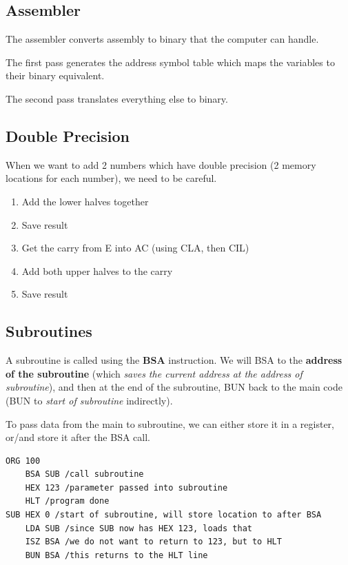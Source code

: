 \documentclass[12pt,letterpaper]{article} \usepackage{amsmath} \usepackage{graphicx} \usepackage[margin=1in]{geometry} \usepackage{longtable}  \usepackage{amssymb}
\begin{document}
			\subsection{Assembler}
			The assembler converts assembly to binary that the computer can handle. 
			
			The first pass generates the address symbol table which maps the variables to their binary equivalent. 
			
			The second pass translates everything else to binary.
			
			\subsection{Double Precision}
			When we want to add 2 numbers which have double precision (2 memory locations for each number), we need to be careful.
			
			\begin{enumerate}
				\item Add the lower halves together
				\item Save result
				\item Get the carry from E into AC (using CLA, then CIL)
				\item Add both upper halves to the carry
				\item Save result 
			\end{enumerate}
			
			\subsection{Subroutines}
			A subroutine is called using the \textbf{BSA} instruction. We will BSA to the \textbf{address of the subroutine} (which \textit{saves the current address at the address of subroutine}), and then at the end of the subroutine, BUN back to the main code (BUN to \textit{start of subroutine} indirectly). 
			
			To pass data from the main to subroutine, we can either store it in a register, or/and store it after the BSA call. 
			
			\begin{mdframed}[]
			
			\begin{lstlisting}[]
    ORG 100
    BSA SUB /call subroutine
    HEX 123 /parameter passed into subroutine
    HLT /program done
SUB HEX 0 /start of subroutine, will store location to after BSA
    LDA SUB /since SUB now has HEX 123, loads that
    ISZ BSA /we do not want to return to 123, but to HLT
    BUN BSA /this returns to the HLT line

			\end{lstlisting}
			\end{mdframed}
		
		
		
		
		
		
		
	
	
	
	
\end{document}
